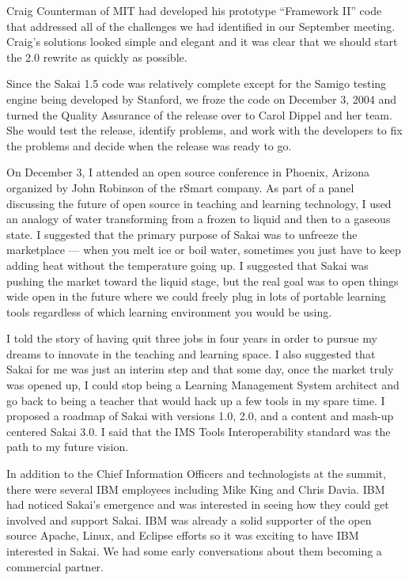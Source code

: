 \documentclass[12pt]{book}
\begin{document}
Craig Counterman of MIT had developed his prototype
``Framework II'' code that addressed all of the
challenges we had identified in our September
meeting.  Craig's solutions looked
simple and elegant and it was clear that
we should start the 2.0 rewrite as quickly
as possible.

Since the Sakai 1.5 code was relatively complete
except for the Samigo testing engine being
developed by Stanford, we froze the code
on December 3, 2004 and turned the Quality
Assurance of the release over to Carol
Dippel and her team.  She would test the release,
identify problems, and work with the developers
to fix the problems and decide when the release
was ready to go.

On December 3, I attended an open source
conference in Phoenix, Arizona
organized by John Robinson of the rSmart
company.  As part of a panel
discussing the future of open source in
teaching and learning technology,
I used an analogy of water
transforming from a frozen to liquid and then to
a gaseous state.  I suggested that the primary
purpose of Sakai was to unfreeze the
marketplace --- when you melt ice or boil water,
sometimes you just have to
keep adding heat without the temperature going up.
I suggested that Sakai was pushing the market toward
the liquid stage, but the real goal was to
open things wide open in the future where we
could freely plug in lots of portable learning
tools regardless of which learning environment
you would be using.

I told the story of having quit three jobs in
four years in order to pursue my dreams to
innovate in the teaching and learning space.
I also suggested that Sakai for me was just
an interim step and that some day, once the
market truly was opened up, I could stop being
a Learning Management System architect and go back
to being a teacher that would hack up a
few tools in my spare time.  I proposed a
roadmap of Sakai with versions 1.0, 2.0, and
a content and mash-up centered Sakai 3.0.
I said that the IMS Tools Interoperability
standard was the path to my future vision.

In addition to the Chief Information Officers and
technologists at the summit, there were several
IBM employees including Mike King and
Chris Davia.  IBM had noticed Sakai's emergence
and was interested in seeing how they could
get involved and support Sakai.  IBM was
already a solid supporter of the open source
Apache, Linux, and Eclipse efforts so it was
exciting to have IBM interested in Sakai.
We had some early conversations about them
becoming a commercial partner.
\end{document}
